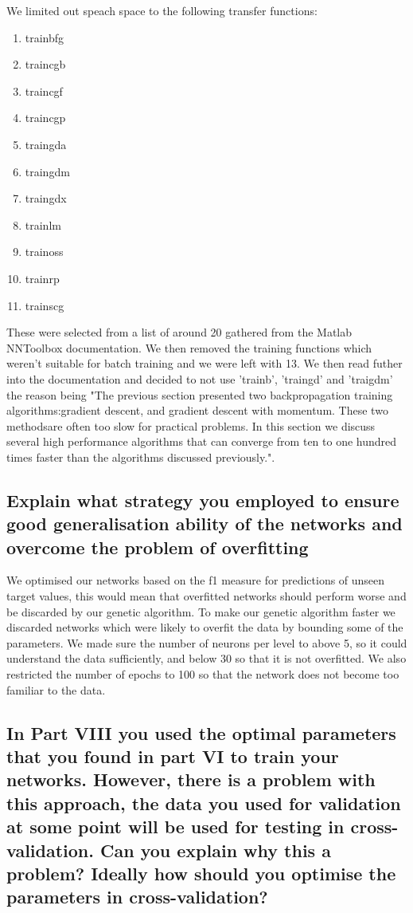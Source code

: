 \documentclass[11pt]{article}
\begin{document}
We limited out speach space to the following transfer functions:
\begin{enumerate}
  \item trainbfg
  \item traincgb
  \item traincgf
  \item traincgp
  \item traingda
  \item traingdm
  \item traingdx
  \item trainlm
  \item trainoss
  \item trainrp
  \item trainscg 
\end{enumerate}

These were selected from a list of around 20 gathered from the Matlab NNToolbox documentation. We then removed the training functions which weren't suitable for batch training and we were left with 13. We then read futher into the documentation and decided to not use 'trainb', 'traingd' and 'traigdm' the reason being "The previous section presented two backpropagation training algorithms:gradient descent, and gradient descent with momentum. These two methodsare often too slow for practical problems. In this section we discuss several high performance algorithms that can converge from ten to one hundred times faster than the algorithms discussed previously.".



\subsection{Explain what strategy you employed to ensure good generalisation ability of the networks and overcome the problem of overfitting}

We optimised our networks based on the f1 measure for predictions of unseen target values, this would mean that overfitted networks should perform worse and be discarded by our genetic algorithm. To make our genetic algorithm faster we discarded networks which were likely to overfit the data by bounding some of the parameters. We made sure the number of neurons per level to above 5, so it could understand the data sufficiently, and below 30 so that it is not overfitted. We also restricted the number of epochs to 100 so that the network does not become too familiar to the data. 

\subsection{In Part VIII you used the optimal parameters that you found in part VI to train your networks. However, there is a problem with this approach, the data you used for validation at some point will be used for testing in cross-validation. Can you explain why this a problem? Ideally how should you optimise the parameters in cross-validation?}
\end{document}
